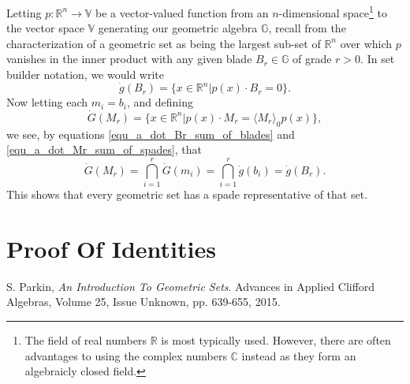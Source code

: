\documentclass{birkjour}
\theoremstyle{definition}
\theoremstyle{remark}
\numberwithin{equation}{section}
\newcommand{\R}{\mathbb{R}}
\newcommand{\C}{\mathbb{C}}
\newcommand{\G}{\mathbb{G}}
\newcommand{\V}{\mathbb{V}}
\newcommand{\gd}{\dot{g}}
\newcommand{\Gd}{\dot{G}}
\begin{document}
Letting $p:\R^n\to\V$ be a vector-valued function from an $n$-dimensional space\footnote{The field of real numbers $\R$ is most typically used.
However, there are often advantages to using the complex numbers $\C$ instead as they form an algebraicly closed field.} to the vector
space $\V$ generating our geometric algebra $\G$, recall from \cite{Parkin15} the characterization of a geometric set as being the largest sub-set of $\R^n$
over which $p$ vanishes in the inner product with any given blade $B_r\in\G$ of grade $r>0$.  In set builder notation, we would write
\begin{equation*}
\gd(B_r) = \{x\in\R^n|p(x)\cdot B_r=0\}.
\end{equation*}
Now letting each $m_i=b_i$, and defining
\begin{equation*}
\Gd(M_r) = \{x\in\R^n|p(x)\cdot M_r=\langle M_r\rangle_0p(x)\},
\end{equation*}
we see, by equations \eqref{equ_a_dot_Br_sum_of_blades} and \eqref{equ_a_dot_Mr_sum_of_spades}, that
\begin{equation*}
\Gd(M_r) = \bigcap_{i=1}^r\Gd(m_i) = \bigcap_{i=1}^r\gd(b_i) = \gd(B_r).
\end{equation*}
This shows that every geometric set has a spade representative of that set.

\section{Proof Of Identities}

\begin{thebibliography}{9}

S. Parkin,
\emph{An Introduction To Geometric Sets}.
Advances in Applied Clifford Algebras, Volume 25, Issue Unknown, pp. 639-655, 2015.

\end{thebibliography}
\end{document}
